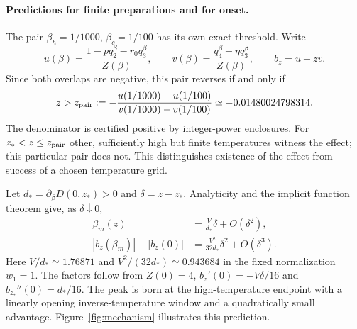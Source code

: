 \documentclass[11pt]{article}
\begin{document}
\paragraph{Predictions for finite preparations and for onset.}
The pair $\beta_h=1/1000$, $\beta_c=1/100$ has its own exact threshold. Write
\[
u(\beta)=\frac{1-pq_2^\beta-r_0q_3^\beta}{Z(\beta)},\qquad
v(\beta)=\frac{q_4^\beta-\eta q_3^\beta}{Z(\beta)},\qquad b_z=u+zv.
\]
Since both overlaps are negative, this pair reverses if and only if
\[
z>z_{\rm pair}:=-\frac{u(1/1000)-u(1/100)}{v(1/1000)-v(1/100)}
\simeq-0.01480024798314.
\]
The denominator is certified positive by integer-power enclosures. For $z_*<z\leq z_{\rm pair}$ other, sufficiently high but finite temperatures witness the effect; this particular pair does not. This distinguishes existence of the effect from success of a chosen temperature grid.

Let $d_*=\partial_\beta D(0,z_*)>0$ and $\delta=z-z_*$. Analyticity and the implicit function theorem give, as $\delta\downarrow0$,
\begin{align*}
\beta_m(z)&=\frac{V}{d_*}\delta+O(\delta^2),\\
|b_z(\beta_m)|-|b_z(0)|&=\frac{V^2}{32d_*}\delta^2+O(\delta^3).
\end{align*}
Here $V/d_*\simeq1.76871$ and $V^2/(32d_*)\simeq0.943684$ in the fixed normalization $w_1=1$. The factors follow from $Z(0)=4$, $b_z'(0)=-V\delta/16$ and $b_{z_*}''(0)=d_*/16$. The peak is born at the high-temperature endpoint with a linearly opening inverse-temperature window and a quadratically small advantage. Figure~\ref{fig:mechanism} illustrates this prediction.
\end{document}

